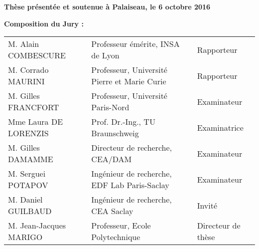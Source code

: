 \begin{titlepage}
\begin{mdframed}
\begin{minipage}[t][22cm][t]{\textwidth}
\vfill
\begin{flushleft}
\large
\textbf{Thèse présentée et soutenue à Palaiseau, le 6 octobre 2016}
\vspace{15pt}

\textbf{Composition du Jury :}

\vspace{15pt}
\begin{tabular}{@{}lll}
M. Alain COMBESCURE & Professeur émérite, INSA de Lyon & Rapporteur \\
M. Corrado MAURINI & Professeur, Université Pierre et Marie Curie & Rapporteur \\
M. Gilles FRANCFORT & Professeur, Université Paris-Nord & Examinateur \\
Mme Laura DE LORENZIS & Prof. Dr.-Ing., TU Braunschweig & Examinatrice \\
M. Gilles DAMAMME & Directeur de recherche, CEA/DAM & Examinateur \\
M. Serguei POTAPOV & Ingénieur de recherche, EDF Lab Paris-Saclay & Examinateur \\
M. Daniel GUILBAUD & Ingénieur de recherche, CEA Saclay & Invité \\
M. Jean-Jacques MARIGO & Professeur, Ecole Polytechnique & Directeur de thèse
\end{tabular}
\end{flushleft}
\end{minipage}
\end{mdframed}
\end{titlepage}


\setcounter{page}{2}
\restoregeometry